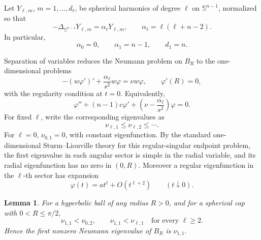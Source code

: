 \documentclass[11pt]{amsart}
\newtheorem{lemma}[theorem]{Lemma}
\theoremstyle{remark}
\newcommand{\Sn}{\mathbb S}
\begin{document}
Let \(Y_{\ell,m}\), \(m=1,\dots,d_\ell\), be spherical harmonics of degree
\(\ell\) on \(\Sn^{n-1}\), normalized so that
$$
        -\Delta_{\Sn^{n-1}}Y_{\ell,m}
        =
        \alpha_\ell Y_{\ell,m},
        \qquad
        \alpha_\ell=\ell(\ell+n-2).
$$
In particular,
$$
        \alpha_0=0,
        \qquad
        \alpha_1=n-1,
        \qquad
        d_1=n.
$$

Separation of variables reduces the Neumann problem on \(B_R\) to the
one-dimensional problems
\begin{equation}
\label{eq:appendix-sector-equation}
        -(w\varphi')'
        +
        \frac{\alpha_\ell}{s^2}w\varphi
        =
        \nu w\varphi,
        \qquad
        \varphi'(R)=0,
\end{equation}
with the regularity condition at \(t=0\).  Equivalently,
$$
        \varphi''
        +(n-1)c\varphi'
        +
        \left(\nu-\frac{\alpha_\ell}{s^2}\right)\varphi
        =
        0.
$$
For fixed \(\ell\), write the corresponding eigenvalues as
$$
        \nu_{\ell,1}\le\nu_{\ell,2}\le\cdots .
$$
For \(\ell=0\), \(\nu_{0,1}=0\), with constant eigenfunction.  By the
standard one-dimensional Sturm--Liouville theory for this regular-singular
endpoint problem, the first eigenvalue in each angular sector is simple in
the radial variable, and its radial eigenfunction has no zero in \((0,R)\).
Moreover a regular eigenfunction in the \(\ell\)-th sector has expansion
$$
        \varphi(t)=a t^\ell+O(t^{\ell+2})
        \qquad (t\downarrow0).
$$

\begin{lemma}
\label{lem:appendix-sector-ordering-short}
For a hyperbolic ball of any radius \(R>0\), and for a spherical cap with
\(0<R\le\pi/2\),
$$
        \nu_{1,1}<\nu_{0,2},
        \qquad
        \nu_{1,1}<\nu_{\ell,1}
        \quad\text{for every }\ell\ge2.
$$
Hence the first nonzero Neumann eigenvalue of \(B_R\) is \(\nu_{1,1}\).
\end{lemma}
\end{document}
